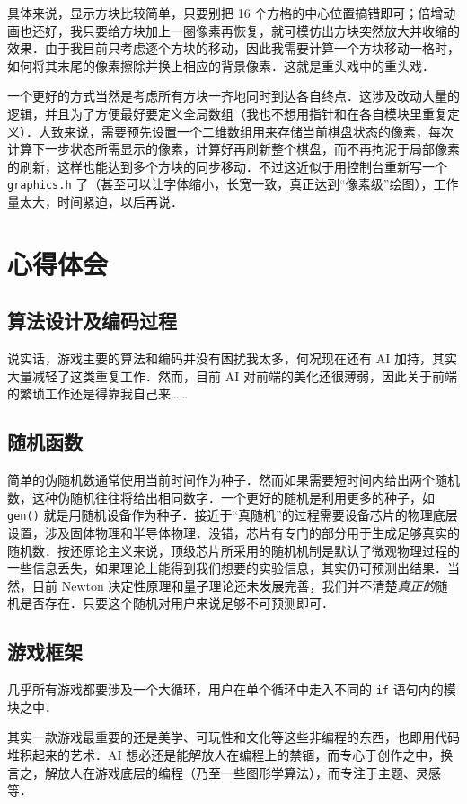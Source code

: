 \documentclass[12pt,a4paper,twoside]{ctexart}
\numberwithin{figure}{section}
\numberwithin{equation}{section}
\begin{document}
具体来说，显示方块比较简单，只要别把 16 个方格的中心位置搞错即可；倍增动画也还好，我只要给方块加上一圈像素再恢复，就可模仿出方块突然放大并收缩的效果．由于我目前只考虑逐个方块的移动，因此我需要计算一个方块移动一格时，如何将其末尾的像素擦除并换上相应的背景像素．这就是重头戏中的重头戏．

一个更好的方式当然是考虑所有方块一齐地同时到达各自终点．这涉及改动大量的逻辑，并且为了方便最好要定义全局数组（我也不想用指针和在各自模块里重复定义）．大致来说，需要预先设置一个二维数组用来存储当前棋盘状态的像素，每次计算下一步状态所需显示的像素，计算好再刷新整个棋盘，而不再拘泥于局部像素的刷新，这样也能达到多个方块的同步移动．不过这近似于用控制台重新写一个 \verb|graphics.h| 了（甚至可以让字体缩小，长宽一致，真正达到“像素级”绘图），工作量太大，时间紧迫，以后再说．

\newpage
\section{心得体会}
\subsection{算法设计及编码过程}
说实话，游戏主要的算法和编码并没有困扰我太多，何况现在还有 AI 加持，其实大量减轻了这类重复工作．然而，目前 AI 对前端的美化还很薄弱，因此关于前端的繁琐工作还是得靠我自己来……

\subsection{随机函数}
简单的伪随机数通常使用当前时间作为种子．然而如果需要短时间内给出两个随机数，这种伪随机往往将给出相同数字．一个更好的随机是利用更多的种子，如 \verb|gen()| 就是用随机设备作为种子．接近于“真随机”的过程需要设备芯片的物理底层设置，涉及固体物理和半导体物理．没错，芯片有专门的部分用于生成足够真实的随机数．按还原论主义来说，顶级芯片所采用的随机机制是默认了微观物理过程的一些信息丢失，如果理论上能得到我们想要的实验信息，其实仍可预测出结果．当然，目前 Newton 决定性原理和量子理论还未发展完善，我们并不清楚\textit{真正的}随机是否存在．只要这个随机对用户来说足够不可预测即可．

\subsection{游戏框架}
几乎所有游戏都要涉及一个大循环，用户在单个循环中走入不同的 \verb|if| 语句内的模块之中．

其实一款游戏最重要的还是美学、可玩性和文化等这些非编程的东西，也即用代码堆积起来的艺术．AI 想必还是能解放人在编程上的禁锢，而专心于创作之中，换言之，解放人在游戏底层的编程（乃至一些图形学算法），而专注于主题、灵感等．
\end{document}
